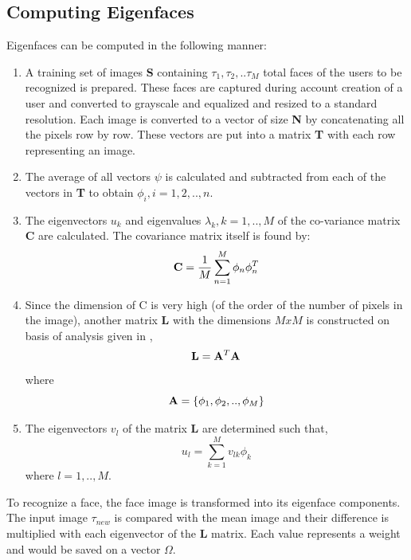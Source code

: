 \documentclass[12pt]{report}			%
\begin{document}
\subsection{ Computing Eigenfaces }
Eigenfaces can be computed in the following manner:
\begin{enumerate}
	\item A training set of images {\bf S} containing $\tau_{1},\tau_{2},..\tau_{M}$ total faces of the users to be recognized is prepared. These faces are captured during account creation of a user and converted to grayscale and equalized and resized to a standard resolution. Each image is converted to a vector of size {\bf N} by concatenating all the pixels row by row. These vectors are put into a matrix {\bf T} with each row representing an image.
	\item The average of all vectors $\psi$ is calculated and subtracted from each of the vectors in {\bf T} to obtain $\phi_{i}, i = 1,2,..,n$.
	\item The eigenvectors $u_{k}$ and eigenvalues $\lambda_{k}, k = 1,..,M$ of the co-variance matrix {\bf C} are calculated. The covariance matrix itself is found by: 
\begin{equation}
{\bf C} = \frac{1}{M}\sum_{n=1}^{M}\phi_{n}\phi_{n}^{T}
\end{equation}
	\item Since the dimension of C is very high (of the order of the number of pixels in the image), another matrix {\bf L} with the dimensions $MxM$ is constructed on basis of analysis given in \cite{Turk91}, 
	\begin{equation}
	{\bf L} = {\bf A}^{T}{\bf A}
	\end{equation}
	where 
	\begin{equation}
	{\bf A} = \{\phi_{1},\phi_{2},..,\phi_{M}\}
	\end{equation}
	\item The eigenvectors $v_{l}$ of the matrix {\bf L} are determined such that,
	\begin{equation}
	u_{l} = \sum_{k=1}^{M}v_{lk}\phi_{k} 
	\end{equation}
where $l = 1,..,M$.
\end{enumerate}

To recognize a face, the face image is transformed into its eigenface components. The input image $\tau_{new}$ is compared with the mean image and their difference is multiplied with each eigenvector of the {\bf L} matrix. Each value represents a weight and would be saved on a vector $\Omega$.
\end{document}
